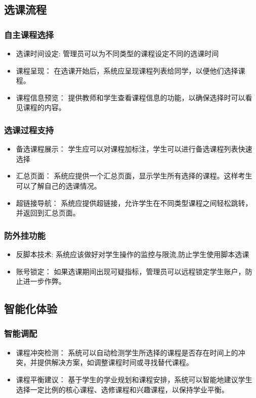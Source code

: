 \documentclass{article}
\begin{document}
\subsection{选课流程}
\subsubsection{自主课程选择}
\begin{itemize}
        \item 选课时间设定: 管理员可以为不同类型的课程设定不同的选课时间
        \item 课程呈现： 在选课开始后，系统应呈现课程列表给同学，以便他们选择课程。
        \item 课程信息预览： 提供教师和学生查看课程信息的功能，以确保选择时可以看见课程的内容。
\end{itemize}
 
\subsubsection{选课过程支持}
\begin{itemize}
        \item 备选课程展示： 学生应可以对课程加标注，学生可以进行备选课程列表快速选择
        \item 汇总页面： 系统应提供一个汇总页面，显示学生所有选择的课程。这样考生可以了解自己的选课情况。
        \item 超链接导航： 系统应提供超链接，允许学生在不同类型课程之间轻松跳转，并返回到汇总页面。
\end{itemize}

\subsubsection{防外挂功能}
\begin{itemize}
        \item 反脚本技术: 系统应该做好对学生操作的监控与限流,防止学生使用脚本选课
        \item 账号锁定： 如果选课期间出现可疑指标，管理员可以远程锁定学生账户，防止进一步作弊。
\end{itemize} 

\subsection{智能化体验}
\subsubsection{智能调配}
\begin{itemize}
\item 课程冲突检测： 系统可以自动检测学生所选择的课程是否存在时间上的冲突，并提供解决方案，如调整课程时间或寻找替代课程。
\item 课程平衡建议： 基于学生的学业规划和课程安排，系统可以智能地建议学生选择一定比例的核心课程、选修课程和兴趣课程，以保持学业平衡。
\end{itemize}
\end{document}
